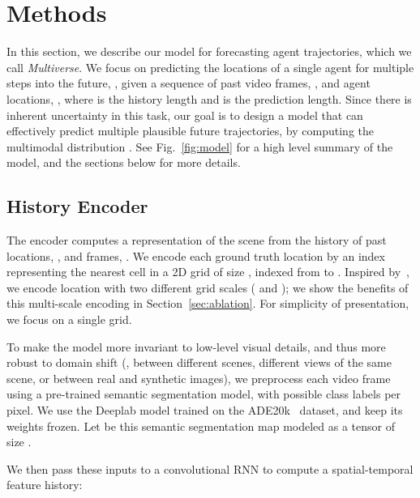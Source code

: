 \documentclass[10pt,twocolumn,letterpaper]{article}
\newcommand{\fancyname}{Multiverse}\newcommand{\Tpred}{T_{\text{pred}}}
\begin{document}
\vspace{-3mm}
\section{Methods}
\vspace{-2mm}
\label{sec:method}
\label{sec:approach}

In this section, we describe our model for forecasting agent
trajectories,
which we call \textit{\fancyname}.
We focus on predicting the locations of a single agent for multiple steps into the future, , 
given a sequence of past video frames, ,
and agent locations, ,
where  is the history length and  is the prediction length.
Since there is inherent uncertainty in this task, our goal is to design a model
that can effectively predict multiple plausible future trajectories,
by computing the multimodal distribution
.
See Fig.~\ref{fig:model} for a high level summary of the model,
and the sections below for more details.


\vspace{-1mm}
\subsection{History Encoder}
\vspace{-1mm}
The encoder computes a representation of the scene
from the history of past locations,
, and frames, .
We encode each ground truth location
 by an index  representing
the nearest cell in a 2D grid  of size , indexed from  to .
 Inspired by~\cite{lazebnik2006beyond,lin2017feature}, 
 we encode location with two different grid scales
 ( and );
 we show the benefits of this multi-scale
 encoding in Section~\ref{sec:ablation}.
For simplicity of presentation,
we focus on a  single  grid.

To make the model more invariant to low-level visual details, and thus more robust to domain shift (\eg, between different scenes, different views of the same scene, or between real and synthetic images), we preprocess each video frame  using a pre-trained semantic segmentation model, with  possible class labels per pixel. 
We use the Deeplab model \cite{chen2017deeplab} trained on the ADE20k~\cite{zhou2017scene} dataset,
and keep its weights frozen.
Let  be this semantic segmentation map modeled as a tensor of size .

We then pass these inputs to a convolutional RNN 
\cite{xingjian2015convolutional,wang2019eidetic}
to compute a spatial-temporal feature history:
\end{document}
